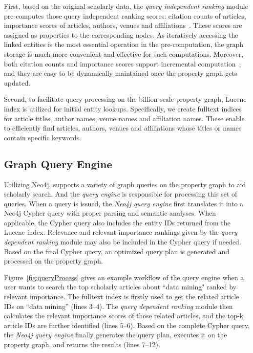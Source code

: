 First, based on the original scholarly data, the {\em query independent ranking} module pre-computes those query independent ranking scores: citation counts of articles, importance scores of articles, authors, venues and affiliations~\cite{ma2018query}. These scores are assigned as properties to the corresponding nodes.
As iteratively accessing the linked entities is the most essential operation in the pre-computation, the graph storage is much more convenient and effective for such computations.
Moreover, both citation counts and importance scores support incremental computation~\cite{ma2018query}, and they are easy to be dynamically maintained once the property graph gets updated.


Second, to facilitate query processing on the billion-scale property graph, Lucene index is utilized for initial entity lookups. Specifically, we create fulltext indices for article titles, author names, venue names and affiliation names. These enable to efficiently find articles, authors, venues and affiliations whose titles or names contain specific keywords. %


\subsection{Graph Query Engine  } \label{subsec:qe}
Utilizing Neo4j, \oursystem supports a variety of graph queries on the property graph to aid scholarly search. And the {\em query engine} is responsible for processing this set of queries. When a query is issued, the {\em Neo4j query engine} first translates it into a  Neo4j Cypher query with proper parsing and semantic analyses. When applicable, the Cypher query also includes the entity IDs returned from the Lucene index. Relevance and relevant importance rankings given by the {\em query dependent ranking} module may also be included in the Cypher query if needed. Based on the final Cypher query, an optimized query plan is generated and processed on the property graph.


Figure~\ref{fig:queryProcess} gives an example workflow of the query engine when a user wants to search the top scholarly articles about ``data mining"  ranked by relevant importance. The fulltext index is firstly used to get the related article IDs on ``data mining'' (lines 3--4). The {\em query dependent ranking} module then calculates the relevant importance scores of those related articles, and the top-k article IDs are further identified (lines 5--6). Based on the complete Cypher query, the {\em Neo4j query engine} finally generates the query plan, executes it on the property graph, and returns the results (lines 7--12).







